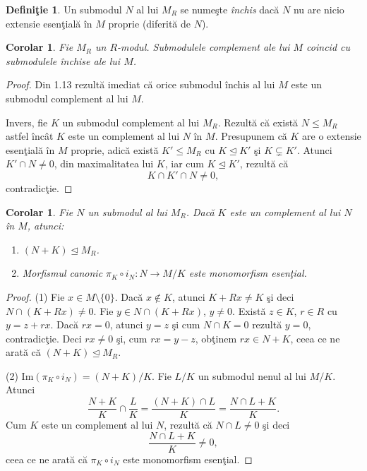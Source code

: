\documentclass[12pt,a4paper]{book}
\newcommand{\ess}{\trianglelefteq}  %
\theoremstyle{plain}
\newtheorem{corollary}[theorem]{Corolar}
\theoremstyle{definition}
\newtheorem{definition}[theorem]{Definiţie}
\theoremstyle{remark}
\begin{document}
\begin{definition}
Un submodul \(N\) al lui \(M_R\) se numeşte \emph{închis} dacă \(N\) nu are
nicio extensie esenţială în \(M\) proprie (diferită de \(N\)).
\end{definition}

\begin{corollary}
Fie \(M_R\) un \(R\)-modul.
Submodulele complement ale lui \(M\) coincid cu submodulele închise ale lui \(M\).
\end{corollary}

\begin{proof}
Din 1.13 rezultă imediat că orice submodul închis al lui \(M\) este un submodul
complement al lui \(M\).

Invers, fie \(K\) un submodul complement al lui \(M_R\).
Rezultă că există \(N \leq M_R\) astfel încât \(K\) este un complement al lui \(N\)
în \(M\).
Presupunem că \(K\) are o extensie esenţială în \(M\) proprie, adică există
\(K' \leq M_R\) cu \(K \ess K'\) şi \(K \subsetneq K'\).
Atunci \(K' \cap N \neq 0\), din maximalitatea lui \(K\), iar cum \(K \ess K'\),
rezultă că
\[
K \cap K' \cap N \neq 0,
\]
contradicţie.
\end{proof}


\begin{corollary}
Fie \(N\) un submodul al lui \(M_R\).
Dacă \(K\) este un complement al lui \(N\) în \(M\), atunci:
\begin{enumerate}
  \item \((N + K) \ess M_R\).
  \item Morfismul canonic \(\pi_K \circ i_N : N \to M/K\) este monomorfism esenţial.
\end{enumerate}
\end{corollary}

\begin{proof}
(1) Fie \(x \in M \setminus \{0\}\).
Dacă \(x \notin K\), atunci \(K + Rx \neq K\) şi deci
\(N \cap (K + Rx) \neq 0\).
Fie \(y \in N \cap (K + Rx)\), \(y \neq 0\).
Există \(z \in K\), \(r \in R\) cu \(y = z + rx\).
Dacă \(rx = 0\), atunci \(y = z\) şi cum \(N \cap K = 0\) rezultă \(y = 0\),
contradicţie.
Deci \(rx \neq 0\) şi, cum \(rx = y - z\), obţinem \(rx \in N + K\), ceea ce
ne arată că \((N + K) \ess M_R\).

(2) \(\mathrm{Im}(\pi_K \circ i_N) = (N + K)/K\).
Fie \(L/K\) un submodul nenul al lui \(M/K\).
Atunci
\[
\frac{N + K}{K} \cap \frac{L}{K}
   = \frac{(N + K) \cap L}{K}
   = \frac{N \cap L + K}{K}.
\]
Cum \(K\) este un complement al lui \(N\), rezultă că \(N \cap L \neq 0\) şi deci
\[
\frac{N \cap L + K}{K} \neq 0,
\]
ceea ce ne arată că \(\pi_K \circ i_N\) este monomorfism esenţial.
\end{proof}
\end{document}
